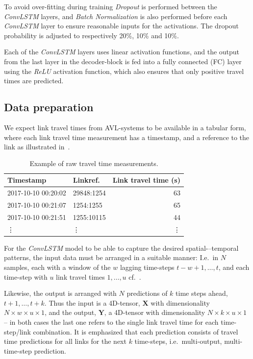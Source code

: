 \documentclass[preprint,11pt,5p,twocolumn]{elsarticle}
\newcommand{\matr}[1]{\mathbf{#1}}
\begin{document}
To avoid over-fitting during training \emph{Dropout} \cite{Dropout} is performed between the \emph{ConvLSTM} layers, and \emph{Batch Normalization} \cite{BatchNorm} is also performed before each \emph{ConvLSTM} layer to ensure reasonable inputs for the activations. The dropout probability is adjusted to respectively 20\%, 10\% and 10\%.

Each of the \emph{ConvLSTM} layers uses linear activation functions, and the output from the last layer in the decoder-block is fed into a fully connected (FC) layer using the \emph{ReLU} activation function, which also ensures that only positive travel times are predicted.

\subsection{Data preparation}
We expect link travel times from AVL-systems to be available in a tabular form, where each link travel time measurement has a timestamp, and a reference to the link as illustrated in~.
\begin{table}[!ht]
  \centering
  \footnotesize
  \begin{tabular}{llr}
    Timestamp & Linkref. & Link travel time (s) \\ \hline \hline
    2017-10-10 00:20:02 & 29848:1254 & 63 \\ \hline
    2017-10-10 00:21:07 & 1254:1255  & 65 \\ \hline
    2017-10-10 00:21:51 & 1255:10115 & 44 \\ \hline
    \vdots & \vdots & \vdots 
  \end{tabular}
  \caption{Example of raw travel time measurements.}
  \label{tab:data}
\end{table}

For the \emph{ConvLSTM} model to be able to capture the desired spatial-–temporal patterns, the input data must be arranged in a suitable manner: I.e.\ in $N$ samples, each with a window of the $w$ lagging time-steps $t-w+1, \ldots, t$, and each time-step with $u$ link travel times $1, \ldots, u$ cf.~.

Likewise, the output is arranged with $N$ predictions of $k$ time steps ahead, $t+1, \ldots, t+k$. Thus the input is a 4D-tensor, $\matr{X}$ with dimensionality $N \times w \times u \times 1$, and the output, $\matr{Y}$, a 4D-tensor with dimensionality $N \times k \times u \times 1$ -- in both cases the last one refers to the single link travel time for each time-step/link combination. It is emphasized that each prediction consists of travel time predictions for all links for the next $k$ time-steps, i.e.\ multi-output, multi-time-step prediction.
\end{document}
